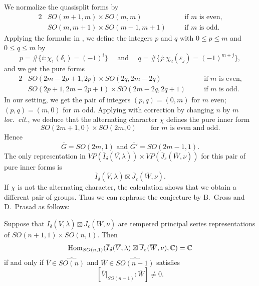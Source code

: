 \medskip
We normalize the quasisplit forms  by 
\begin{alignat*}{2}
 &SO(m+1,m) \times SO(m,m) \quad &&\mbox{if $m$ is even,} 
\\
 &SO(m,m+1) \times SO(m-1, m+1)  \quad &&\mbox{if $m$ is odd.} 
\end{alignat*}
Applying the formul{\ae} in \cite[(12.21)]{GP}, 
 we define the integers $p$ and $q$
 with $0 \leq p \leq m $ and $0 \leq q \leq m$
by
\[
 p = \# \{ i : \chi_1(    \delta_i  )  = (-1)^i  \}  \quad \mbox{ and }  
\quad  q  =  \# \{ j:  \chi_2(   \varepsilon_j     )  = (-1)^{m+j}  \}, 
\]
and we get the pure forms
\begin{alignat*}{2}
&SO(2m-2p+1, 2p) \times SO(2q ,2m-2q) \quad &&\mbox{if $m$ is even,}
\\
&SO(2p+1,2m-2p+1) \times SO(2m-2q, 2q+1) \quad &&\mbox{if $m$ is odd.}
\end{alignat*}
In our setting,  we get the pair of integers $(p,q)=(0,m)$ for $m$ even; $(p,q)=(m,0)$ for $m$ odd.
\medskip
Applying \cite[(12.22)]{GP} with correction by changing $n$ by $m$ 
 {\it{loc.~cit.}},
 we deduce
 that the alternating character $\chi$ defines
 the pure inner form 
\begin{equation*}
SO(2m+1,0) \times SO(2m,0)
\qquad
\mbox{for $m$ is even and odd.}
\end{equation*}  
Hence 
\[
   \overline G=SO(2m,1) \mbox{ and } \overline{G'}=SO(2m-1,1).   
\]
The only representation in $VP(\overline{I}_\delta(\overline{V,}\lambda))\times VP(\overline{J}_\varepsilon(\overline{W},\nu))$
 for this pair of pure inner forms  is 
\[
   \overline{I}_\delta(\overline{V},\lambda)
   \boxtimes 
   \overline{J}_\varepsilon(\overline{W},\nu). 
\]
If $\chi $ is not the alternating character,
 the calculation shows that  we obtain a different pair of groups.
Thus we can rephrase the conjecture by B.~Gross and D.~Prasad
 as follows:

\begin{conjecture}
\label{conj:GPA}
Suppose that $\overline{I}_\delta(\overline{V},\lambda)\boxtimes \overline{J}_\varepsilon(\overline{W},\nu)$ are tempered principal series representations
 of $SO(n+1,1) \times SO(n,1)$.  
Then    
\[ 
    {\operatorname{Hom}}_{SO(n,1)}(\overline{I}_\delta(\overline{V},\lambda)
\boxtimes \overline{J}_\varepsilon(\overline{W},\nu),{\mathbb{C}})={\mathbb C}
\]
if and only if $\overline{V } \in \widehat{SO(n)}$ and $\overline{W} \in \widehat{SO(n-1)}$
 satisfies 
\[ 
   [\overline{V}|_{SO(n-1)}:\overline{W}] \ne 0.
\]
\end{conjecture}

